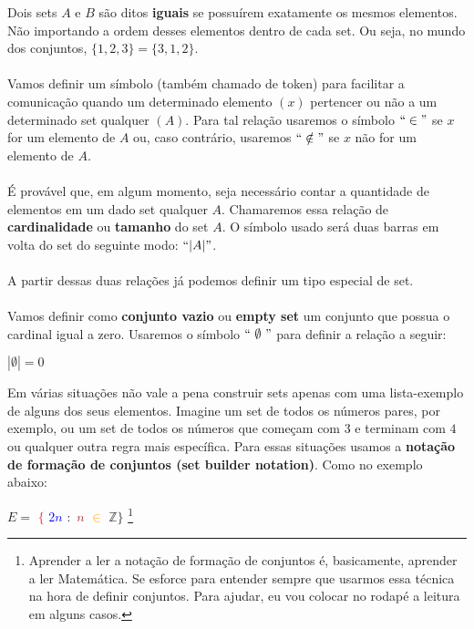\documentclass[main.tex]{subfiles}
\begin{document}
Dois sets $A$ e $B$ são ditos \textbf{iguais} se possuírem exatamente os mesmos elementos. Não importando a ordem desses elementos dentro de cada set. Ou seja, no mundo dos conjuntos, $ \{ 1,2,3 \} = \{3,1,2\}$.
\\~\\
Vamos definir um símbolo (também chamado de token) para facilitar a comunicação quando um determinado elemento $(x)$ pertencer ou não a um determinado set qualquer $(A)$. Para tal relação usaremos o símbolo $``\in"$ se $x$ for um elemento de $A$ ou, caso contrário, usaremos $``\notin"$ se $x$ não for um elemento de $A$.
\\~\\
É provável que, em algum momento, seja necessário contar a quantidade de elementos em um dado set qualquer $A$. Chamaremos essa relação de \textbf{cardinalidade} ou \textbf{tamanho} do set $A$. O símbolo usado será duas barras em volta do set do seguinte modo: $``|A|"$.
\\~\\
A partir dessas duas relações já podemos definir um tipo especial de set.
\\~\\
Vamos definir como \textbf{conjunto vazio} ou \textbf{empty set} um conjunto que possua o cardinal igual a zero. Usaremos o símbolo $`` \ \emptyset \ "$ para definir a relação a seguir:

\begin{center}
	$|\emptyset| = 0$
\end{center}

Em várias situações não vale a pena construir sets apenas com uma lista-exemplo de alguns dos seus elementos. Imagine um set de todos os números pares, por exemplo, ou um set de todos os números que começam com $3$ e terminam com $4$ ou qualquer outra regra mais específica. Para essas situações usamos a \textbf{notação de formação de conjuntos (set builder notation)}. Como no exemplo abaixo:

\begin{center}
	$ E = $ \textcolor{red}{$\{$} \textcolor{blue}{$2n$} \textcolor{OliveGreen}{$:$} \textcolor{Brown}{$n$} \textcolor{Orange}{$\in$} $\mathbb{Z} \} $ \footnote{Aprender a ler a notação de formação de conjuntos é, basicamente, aprender a ler Matemática. Se esforce para entender sempre que usarmos essa técnica na hora de definir conjuntos. Para ajudar, eu vou colocar no rodapé a leitura em alguns casos.}
\end{center}
\end{document}
